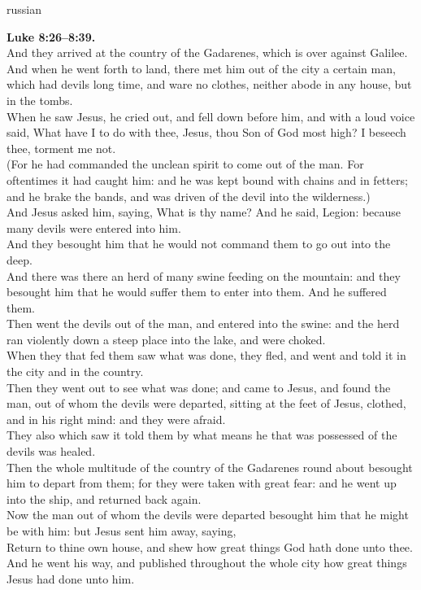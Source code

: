\documentclass[10pt]{article} %
\begin{document}
{\begin{minipage}[t]{0.45\textwidth}
\begin{otherlanguage*}{russian}
\end{otherlanguage*}
\end{minipage}
\hfill
\begin{minipage}[t]{0.45\textwidth}

\textbf{Luke 8:26--8:39.}\\
And they arrived at the country of the Gadarenes, which is over against Galilee.\\
And when he went forth to land, there met him out of the city a certain man, which had devils long time, and ware no clothes, neither abode in any house, but in the tombs.\\
When he saw Jesus, he cried out, and fell down before him, and with a loud voice said, What have I to do with thee, Jesus, thou Son of God most high? I beseech thee, torment me not.\\
(For he had commanded the unclean spirit to come out of the man. For oftentimes it had caught him: and he was kept bound with chains and in fetters; and he brake the bands, and was driven of the devil into the wilderness.)\\
And Jesus asked him, saying, What is thy name? And he said, Legion: because many devils were entered into him.\\
And they besought him that he would not command them to go out into the deep.\\
And there was there an herd of many swine feeding on the mountain: and they besought him that he would suffer them to enter into them. And he suffered them.\\
Then went the devils out of the man, and entered into the swine: and the herd ran violently down a steep place into the lake, and were choked.\\
When they that fed them saw what was done, they fled, and went and told it in the city and in the country.\\
Then they went out to see what was done; and came to Jesus, and found the man, out of whom the devils were departed, sitting at the feet of Jesus, clothed, and in his right mind: and they were afraid.\\
They also which saw it told them by what means he that was possessed of the devils was healed.\\
Then the whole multitude of the country of the Gadarenes round about besought him to depart from them; for they were taken with great fear: and he went up into the ship, and returned back again.\\
Now the man out of whom the devils were departed besought him that he might be with him: but Jesus sent him away, saying,\\
Return to thine own house, and shew how great things God hath done unto thee. And he went his way, and published throughout the whole city how great things Jesus had done unto him.\\

\end{minipage}}
\end{document}
